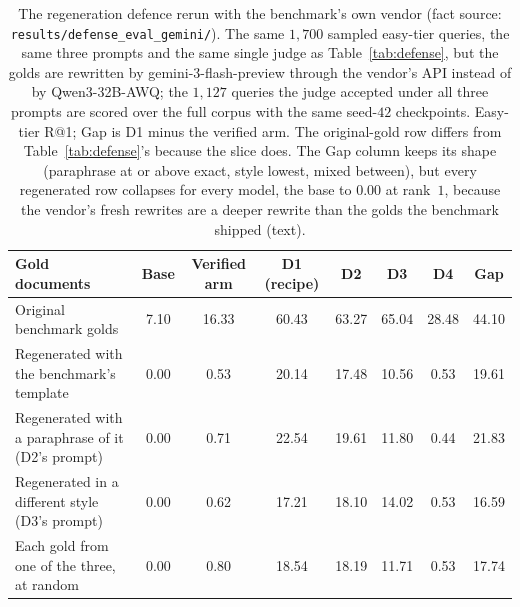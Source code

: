 \begin{table}[t]
\centering
\caption{The regeneration defence rerun with the benchmark's own vendor (fact source: \texttt{results/defense\_eval\_gemini/}). The same $1{,}700$ sampled easy-tier queries, the same three prompts and the same single judge as Table~\ref{tab:defense}, but the golds are rewritten by gemini-3-flash-preview through the vendor's API instead of by Qwen3-32B-AWQ; the $1{,}127$ queries the judge accepted under all three prompts are scored over the full corpus with the same seed-$42$ checkpoints. Easy-tier R@1; Gap is D1 minus the verified arm. The original-gold row differs from Table~\ref{tab:defense}'s because the slice does. The Gap column keeps its shape (paraphrase at or above exact, style lowest, mixed between), but every regenerated row collapses for every model, the base to $0.00$ at rank~$1$, because the vendor's fresh rewrites are a deeper rewrite than the golds the benchmark shipped (text).}
\label{tab:defense-gemini}
\footnotesize
\setlength{\tabcolsep}{3pt}
\begin{tabular}{@{}>{\raggedright\arraybackslash}p{4.4cm}ccccccc@{}}
\toprule
Gold documents & Base & Verified arm & D1 (recipe) & D2 & D3 & D4 & Gap \\
\midrule
Original benchmark golds & 7.10 & 16.33 & 60.43 & 63.27 & 65.04 & 28.48 & 44.10 \\
Regenerated with the benchmark's template & 0.00 & 0.53 & 20.14 & 17.48 & 10.56 & 0.53 & 19.61 \\
Regenerated with a paraphrase of it (D2's prompt) & 0.00 & 0.71 & 22.54 & 19.61 & 11.80 & 0.44 & 21.83 \\
Regenerated in a different style (D3's prompt) & 0.00 & 0.62 & 17.21 & 18.10 & 14.02 & 0.53 & 16.59 \\
Each gold from one of the three, at random & 0.00 & 0.80 & 18.54 & 18.19 & 11.71 & 0.53 & 17.74 \\
\bottomrule
\end{tabular}
\end{table}

